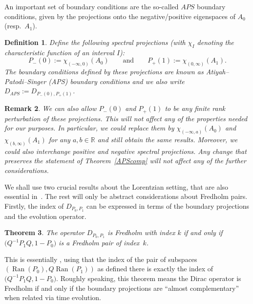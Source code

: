 \documentclass[10pt,a4paper]{amsart}
\numberwithin{equation}{section}
\newtheorem{Theorem}{Theorem}[section]
\newtheorem{Definition}[Theorem]{Definition}
\newtheorem{Remark}[Theorem]{Remark} }
\DeclareMathOperator{\Ran}{Ran}
\begin{document}
	 An important set of boundary conditions are the so-called $APS$ boundary conditions, given by the projections onto the negative/positive eigenspaces of $A_0$ (resp.\ $A_1$).
	\begin{Definition}
		Define the following spectral projections (with $\chi_I$ denoting the characteristic function of an interval $I$):
		\[P_-(0):=\chi_{(-\infty,0)}(A_0)\qquad \text{and}\qquad P_+(1):=\chi_{(0,\infty)}(A_1).\]
		The boundary conditions defined by these projections are known as Atiyah--Patodi--Singer (APS) boundary conditions and we also write $D_{APS}:=D_{P_-(0),P_+(1)}$.
	\end{Definition}
	\begin{Remark}
		We can also allow $P_-(0)$ and $P_+(1)$ to be any finite rank perturbation of these projections. This will not affect any of the properties needed for our purposes. In particular, we could replace them by $\chi_{(-\infty,a)}(A_0)$ and $\chi_{(b,\infty)}(A_1)$ for any $a,b\in \mathbb{R}$ and still obtain the same results. Moreover, we could also interchange positive and negative spectral projections. Any change that preserves the statement of Theorem~\ref{APScomp} will not affect any of the further considerations.
	\end{Remark}

	We shall use two crucial results about the Lorentzian setting, that are also essential in~\cite{BH}. The rest will only be abstract considerations about Fredholm pairs.
	Firstly, the index of $D_{P_0,P_1}$ can be expressed in terms of the boundary projections and the evolution operator.
	\begin{Theorem}
		\label{bdyindex}
		The operator $D_{P_0,P_1}$ is Fredholm with index $k$ if and only if
        $
        \bigl(Q^{-1}P_1Q,1-P_0\bigr)$
        is a Fredholm pair of index~$k$.
	\end{Theorem}
	This is essentially \cite[Theorem 4.2]{BH}, using that the index of the pair of subspaces $(\Ran(P_0),\allowbreak Q\Ran(P_1))$ as defined there is exactly the index of $\bigl(Q^{-1}P_1Q,1-P_0\bigr)$.
	Roughly speaking, this theorem means the Dirac operator is Fredholm if and only if the boundary projections are ``almost complementary'' when related via time evolution.
\end{document}
